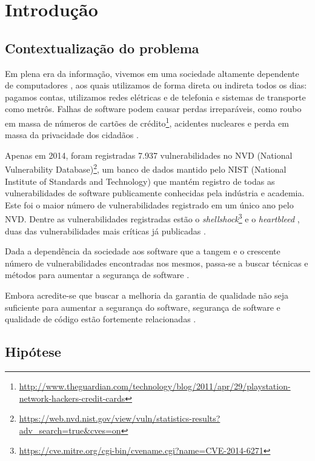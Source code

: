 \chapter{Introdução} \label{introducao}

\section{Contextualização do problema}

Em plena era da informação, vivemos em uma sociedade altamente dependente de computadores \cite{inclusao}, aos quais utilizamos de forma direta ou indireta todos os dias: pagamos contas, utilizamos redes elétricas e de telefonia e sistemas de transporte como metrôs.  Falhas de software podem causar perdas irreparáveis, como roubo em massa de números de cartões de crédito\footnote{\url{http://www.theguardian.com/technology/blog/2011/apr/29/playstation-network-hackers-credit-cards}}, acidentes nucleares \cite{stuxnet} e perda em massa da privacidade dos cidadãos \cite{snowden}.

Apenas em 2014, foram registradas 7.937 vulnerabilidades no NVD (National Vulnerability Database)\footnote{\url{https://web.nvd.nist.gov/view/vuln/statistics-results?adv_search=true&cves=on}}, um banco de dados mantido pelo NIST (National Institute of Standards and Technology) que mantém registro de todas as vulnerabilidades de software publicamente conhecidas pela indústria e academia. Este foi o maior número de vulnerabilidades registrado em um único ano pelo NVD. Dentre as vulnerabilidades registradas estão o \textit{shellshock}\footnote{\url{https://cve.mitre.org/cgi-bin/cvename.cgi?name=CVE-2014-6271}} e o \textit{heartbleed} \cite{heartbleed}, duas das vulnerabilidades mais críticas já publicadas \cite{heartbleed}.

Dada a dependência da sociedade aos software que a tangem e o crescente número de vulnerabilidades encontradas nos mesmos, passa-se a buscar técnicas e métodos para aumentar a segurança de software \cite{sociedade}.

Embora acredite-se que buscar a melhoria da garantia de qualidade não seja suficiente para aumentar a segurança do software, segurança de software e qualidade de código estão fortemente relacionadas \cite{secure_programming}.

\section{Hipótese}

